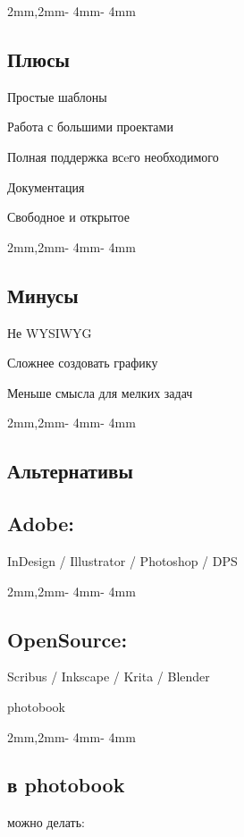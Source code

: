 \documentclass[
	layoutmode=block,
	blockwidth=96mm, blockheight=108mm,
	bleed=0mm,
	bindingoffset=0mm,
	imageblockwidth=0.98, imageblockheight=0.98,
	imageblockoffsettop=0mm,
	12pt,final,openany
]{photobook}
\newcommand\PageFushRightC[1]{
	\begin{page}
		\begin{cell}{2mm,2mm}{\paperwidth - 4mm}{\paperheight - 4mm}
			\null
			\vfill
			\begin{flushright}
				#1
			\end{flushright}
			\vfill
			\null
		\end{cell}
	\end{page}}
\newcommand\PageFushLeftC[1]{
	\begin{page}
		\begin{cell}{2mm,2mm}{\paperwidth - 4mm}{\paperheight - 4mm}
			\null
			\vfill
			\begin{flushleft}
				#1
			\end{flushleft}
			\vfill
			\null
		\end{cell}
	\end{page}}
\begin{document}
\newcommand\seppoints{%
	\par
	\vspace{0.1em}}
\PageFushRightC{
	\section*{Плюсы}
	Простые шаблоны
	\seppoints
	Работа с большими проектами
	\seppoints
	Полная поддержка всeго необходимого
	\seppoints
	Документация
	\seppoints
	Свободное и открытое
}
\PageFushLeftC{
	\vspace{-0.5em}
	\section*{Минусы}
	Не WYSIWYG
	\seppoints
	Сложнее создовать графику
	\seppoints
	Меньше смысла для мелких задач
}



\PageFushRightC{
	\section*{Альтернативы}
	\vspace{1em}
	\subsection*{Adobe:}
	\vspace{-.7em}
	InDesign / Illustrator / Photoshop / DPS }
\PageFushLeftC{
	\vspace{-0.5em}
	\subsection*{OpenSource:}
	\vspace{-.7em}
	Scribus / Inkscape / Krita / Blender }



\begin{spreadtopages}
	\vfill
	\begin{center}
		\fontsize{42pt}{45pt}\selectfont
		photobook
	\end{center}
	\vfill
\end{spreadtopages}



\PageFushRightC{
	\section*{в photobook}
	\vspace{-7mm}
	можно делать:}
\end{document}
